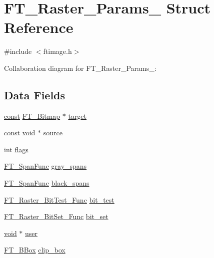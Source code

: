 \hypertarget{struct_f_t___raster___params__}{}\section{F\+T\+\_\+\+Raster\+\_\+\+Params\+\_\+ Struct Reference}
\label{struct_f_t___raster___params__}


{\ttfamily \#include $<$ftimage.\+h$>$}



Collaboration diagram for F\+T\+\_\+\+Raster\+\_\+\+Params\+\_\+\+:
\subsection*{Data Fields}
\begin{DoxyCompactItemize}
\item 
\hyperlink{zconf_8h_a2c212835823e3c54a8ab6d95c652660e}{const} \hyperlink{ftimage_8h_ae28691030f2d16376937cf5e3485f921}{F\+T\+\_\+\+Bitmap} $\ast$ \hyperlink{struct_f_t___raster___params___a2ba8941740db23ec91302aa9bd154da3}{target}
\item 
\hyperlink{zconf_8h_a2c212835823e3c54a8ab6d95c652660e}{const} \hyperlink{png_8h_ac9c84fa68bbad002983e35ce3663c686}{void} $\ast$ \hyperlink{struct_f_t___raster___params___a9be95865384791b018f7a9665a062ee5}{source}
\item 
int \hyperlink{struct_f_t___raster___params___a1a28ab69b8296b4378886d1a2b57d333}{flags}
\item 
\hyperlink{ftimage_8h_abae5f0d92287252b367d3e8210ec4e3a}{F\+T\+\_\+\+Span\+Func} \hyperlink{struct_f_t___raster___params___a456191f1944775933e3d9d36c8632c35}{gray\+\_\+spans}
\item 
\hyperlink{ftimage_8h_abae5f0d92287252b367d3e8210ec4e3a}{F\+T\+\_\+\+Span\+Func} \hyperlink{struct_f_t___raster___params___a42c30e60ad5e243cf78833232e052b47}{black\+\_\+spans}
\item 
\hyperlink{ftimage_8h_a2ac5897dab423a944f4457a3131061e4}{F\+T\+\_\+\+Raster\+\_\+\+Bit\+Test\+\_\+\+Func} \hyperlink{struct_f_t___raster___params___aff3c1a2a7eda24136a46715128d24ed6}{bit\+\_\+test}
\item 
\hyperlink{ftimage_8h_a715e9f91407a9758dbefb6dd6549fe35}{F\+T\+\_\+\+Raster\+\_\+\+Bit\+Set\+\_\+\+Func} \hyperlink{struct_f_t___raster___params___ac66c3c44fcb63c254a46170d85d653c0}{bit\+\_\+set}
\item 
\hyperlink{png_8h_ac9c84fa68bbad002983e35ce3663c686}{void} $\ast$ \hyperlink{struct_f_t___raster___params___af78bac59f93c989840bbcbcbefd77c55}{user}
\item 
\hyperlink{ftimage_8h_ae341c4eb5a7199947a13b2a1dcaf7af7}{F\+T\+\_\+\+B\+Box} \hyperlink{struct_f_t___raster___params___ab32f75f19d9cacb20e410886c055e306}{clip\+\_\+box}
\end{DoxyCompactItemize}


